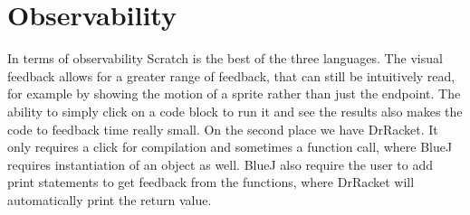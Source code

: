 \section{Observability}
\label{sec:observability}
In terms of observability Scratch is the best of the three languages.
The visual feedback allows for a greater range of feedback, that can still be intuitively read, for example by showing the motion of a sprite rather than just the endpoint.
The ability to simply click on a code block to run it and see the results also makes the code to feedback time really small.
On the second place we have DrRacket.
It only requires a click for compilation and sometimes a function call, where BlueJ requires instantiation of an object as well.
BlueJ also require the user to add print statements to get feedback from the functions, where DrRacket will automatically print the return value.
